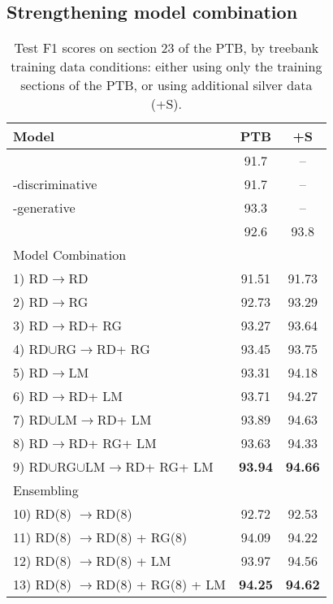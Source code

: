 \documentclass[11pt,a4paper]{article}
\newcommand{\rnngd}{\textsc{RD}\xspace}
\newcommand{\lstm}{\textsc{LM}\xspace}
\newcommand{\rnngg}{\textsc{RG}\xspace}
\newcommand{\p}{\ensuremath{\rightarrow}\xspace}
\newcommand{\un}{\ensuremath{\cup}\xspace}
\begin{document}
\subsection{Strengthening model combination}
\begin{table}
\centering
\begin{tabularx}{1.05\linewidth}{Xcc}
Model & PTB & +S \\
\hline \hline
\mbox{}\citet{Liu16ShiftReduce} & 91.7 & -- \\
\mbox{}\citet{dyer2016recurrent}-discriminative & 91.7 & -- \\
\mbox{}\citet{dyer2016recurrent}-generative & 93.3 & -- \\
\mbox{}\citet{Choe16Parsing} & 92.6 & 93.8 \\
\hline 
Model Combination \\
\hline
1) \small{\rnngd \p \rnngd}  & 91.51 & 91.73  \\
2) \small{\rnngd \p \rnngg}  & 92.73 & 93.29 \\
3) \small{\rnngd \p \rnngd + \rnngg} & 93.27 & 93.64 \\
4) \small{\rnngd \un \rnngg \p\rnngd + \rnngg} &93.45 & 93.75  \\
5) \small{\rnngd \p \lstm}  & 93.31 & 94.18  \\
6) \small{\rnngd \p \rnngd + \lstm} &93.71 & 94.27 \\
7) \small{\rnngd \un \lstm \p \rnngd + \lstm}& 93.89 & 94.63 \\
8) \small{\rnngd \p \rnngd + \rnngg + \lstm}&93.63 & 94.33 \\
9) \small{\rnngd \un \rnngg \un \lstm \p \rnngd + \rnngg + \lstm} &{\bf 93.94} & {\bf 94.66}\\
\hline
Ensembling \\
\hline
10) \small{\rnngd(8) \p \rnngd(8)} & 92.72 & 92.53 \\
11) \small{\rnngd(8) \p \rnngd(8) + \rnngg(8)}  & 94.09 & 94.22 \\
12) \small{\rnngd(8) \p \rnngd(8) + \lstm}  & 93.97 & 94.56  \\
13) \small{\rnngd(8) \p \rnngd(8) + \rnngg(8) + \lstm} & {\bf 94.25} & {\bf 94.62} \\

\end{tabularx}
\caption{\label{tab:final_test_results} Test F1 scores on section 23 of the PTB, by treebank training data conditions: either using only the training sections of the PTB, or using additional silver data (+S).}
\vspace{-1em}
\end{table}
\end{document}
